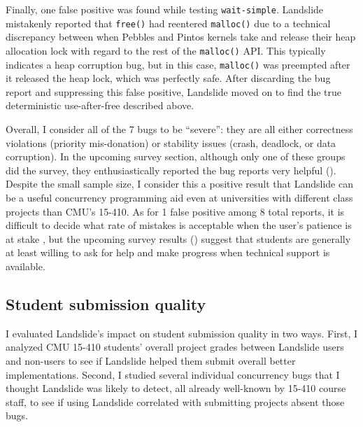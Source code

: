 
Finally, one false positive was found while testing {\tt wait-simple}.
Landslide mistakenly reported that {\tt free()} had reentered {\tt malloc()}
due to a technical discrepancy between when Pebbles and Pintos kernels take and release their heap allocation lock
with regard to the rest of the {\tt malloc()} API.
This typically indicates a heap corruption bug, but in this case,
{\tt malloc()} was preempted after it released the heap lock, which was perfectly safe.
After discarding the bug report and suppressing this false positive,
Landslide moved on to find the true deterministic use-after-free described above.

Overall, I consider all of the 7 bugs to be ``severe'':
they are all either correctness violations (priority mis-donation)
or stability issues (crash, deadlock, or data corruption).
In the upcoming survey section, although only one of these groups did the survey,
they enthusiastically reported 
the bug reports very helpful (\sect{\ref{sec:education-survey-response-data}}).
Despite the small sample size, I consider this
a positive result that Landslide can be a useful concurrency programming aid
even at universities with different class projects than CMU's 15-410.
As for 1 false positive among 8 total reports,
it is difficult to decide what rate of mistakes is acceptable when the user's patience is at stake \cite{racerx},
but the upcoming survey results (\sect{\ref{sec:education-eval-survey-falsepositives}})
suggest that students are generally at least willing
to ask for help and make progress when technical support is available.

\subsection{Student submission quality}
\label{sec:education-eval-grades}

I evaluated Landslide's impact on student submission quality in two ways.
First, I analyzed CMU 15-410 students' overall project grades between Landslide users and non-users
to see if Landslide  helped them submit overall better implementations.
Second, I studied
several %
individual concurrency bugs that I thought Landslide was likely to detect,
all already well-known by 15-410 course staff,
to see if using Landslide correlated with submitting projects absent those bugs.

